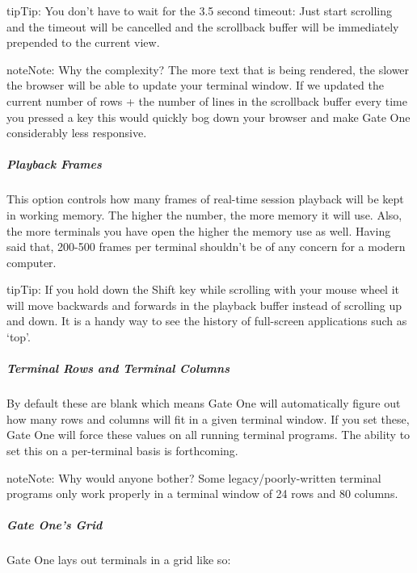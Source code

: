 \documentclass[letterpaper,10pt,openany]{sphinxmanual}
\begin{document}
\begin{notice}{tip}{Tip:}
You don't have to wait for the 3.5 second timeout:  Just start scrolling and the timeout will be cancelled and the scrollback buffer will be immediately prepended to the current view.
\end{notice}

\begin{notice}{note}{Note:}
Why the complexity?  The more text that is being rendered, the slower the browser will be able to update your terminal window.  If we updated the current number of rows + the number of lines in the scrollback buffer every time you pressed a key this would quickly bog down your browser and make Gate One considerably less responsive.
\end{notice}


\subparagraph{Playback Frames}
\label{Applications/terminal/userguide:playback-frames}
This option controls how many frames of real-time session playback will be kept in working memory.  The higher the number, the more memory it will use.  Also, the more terminals you have open the higher the memory use as well.  Having said that, 200-500 frames per terminal shouldn't be of any concern for a modern computer.

\begin{notice}{tip}{Tip:}
If you hold down the Shift key while scrolling with your mouse wheel it will move backwards and forwards in the playback buffer instead of scrolling up and down.  It is a handy way to see the history of full-screen applications such as `top'.
\end{notice}


\subparagraph{Terminal Rows and Terminal Columns}
\label{Applications/terminal/userguide:terminal-rows-and-terminal-columns}
By default these are blank which means Gate One will automatically figure out how many rows and columns will fit in a given terminal window.  If you set these, Gate One will force these values on all running terminal programs.  The ability to set this on a per-terminal basis is forthcoming.

\begin{notice}{note}{Note:}
Why would anyone bother?  Some legacy/poorly-written terminal programs only work properly in a terminal window of 24 rows and 80 columns.
\end{notice}


\subparagraph{Gate One's Grid}
\label{Applications/terminal/userguide:gate-one-s-grid}
Gate One lays out terminals in a grid like so:
\end{document}
